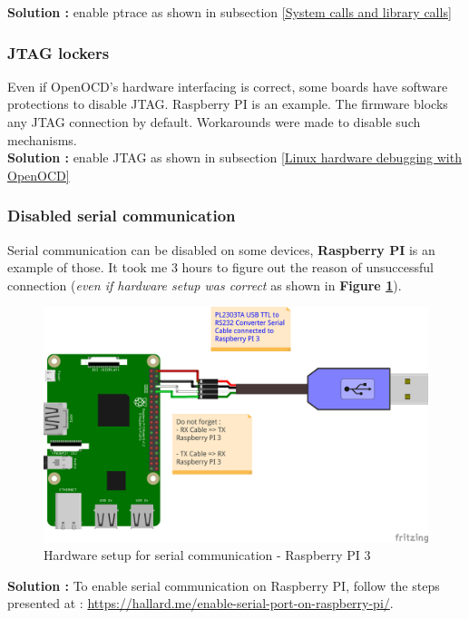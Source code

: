 \textbf{\color{orange}Solution : } enable ptrace as shown in {\color{red}subsection {\color{blue}\ref{System calls and library calls}}}
\subsubsection{JTAG lockers}
Even if OpenOCD's hardware interfacing is correct, some boards have software protections to disable JTAG. Raspberry PI is an example. The firmware blocks any JTAG connection by default. Workarounds were made to disable such mechanisms.\\

\textbf{\color{orange}Solution : } enable JTAG as shown in {\color{red}subsection {\color{blue}\ref{Linux hardware debugging with OpenOCD}}}
\subsubsection{Disabled serial communication}
Serial communication can be disabled on some devices, \textbf{Raspberry PI} is an example of those. It took me 3 hours to figure out the reason of unsuccessful connection (\textit{even if hardware setup was correct} as shown in \textbf{Figure \ref{Hardware setup for serial communication - Raspberry PI 3}}). 


\begin{figure}[H]
		\centering
        \includegraphics[scale=0.40]{img/issues/USB-Serial-cable-To-Raspberry-PI-3_bb.png}
        \caption{Hardware setup for serial communication - Raspberry PI 3}
        \label{Hardware setup for serial communication - Raspberry PI 3}
    \end{figure}



\textbf{\color{orange}Solution : } To enable serial communication on Raspberry PI, follow the steps presented at : {\color{blue}\url{https://hallard.me/enable-serial-port-on-raspberry-pi/}}.

